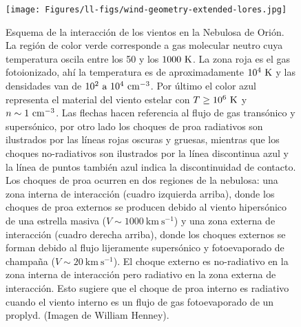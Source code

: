 \begin{figure}
  \centering
  \texttt{[image: Figures/ll-figs/wind-geometry-extended-lores.jpg]}
  \caption{Esquema de la interacción de los vientos en la Nebulosa de Orión. La región de color verde corresponde a gas molecular neutro cuya temperatura oscila entre los 50 y los \(1000~\mathrm{K}\). La zona roja es el gas fotoionizado, ahí la temperatura es de aproximadamente \(10^{4}~\mathrm{K}\) y las densidades van de \(10^{2} ~\text{a}~10^{4} ~\mathrm{cm}^{-3}\). Por último el color azul representa el material del viento estelar con \(T \geq 10^{6}~\mathrm{K}\) y \(n \sim 1~\mathrm{cm}^{-3}\). Las flechas hacen referencia al flujo de gas transónico y supersónico, por otro lado los choques de proa radiativos son ilustrados por las líneas rojas oscuras y gruesas, mientras que los choques no-radiativos son ilustrados por la línea discontinua azul y la línea de puntos también azul indica la discontinuidad de contacto. Los choques de proa ocurren en dos regiones de la nebulosa: una zona interna de interacción (cuadro izquierda arriba), donde los choques de proa externos se producen debido al viento hipersónico de una estrella masiva (\(V \sim 1000~\text{km}~\text{s}^{-1}\)) y una zona externa de interacción (cuadro derecha arriba), donde los choques externos se forman debido al flujo lijeramente supersónico y fotoevaporado de champaña (\(V \sim 20~\text{km}~\text{s}^{-1}\)). El choque externo es no-radiativo en la zona interna de interacción pero radiativo en la zona externa de interacción. Esto sugiere que el choque de proa interno es radiativo cuando el viento interno es un flujo de gas fotoevaporado de un proplyd. (Imagen de William Henney).}
  \label{fig:esquema-interraccion-vientos}
\end{figure}


